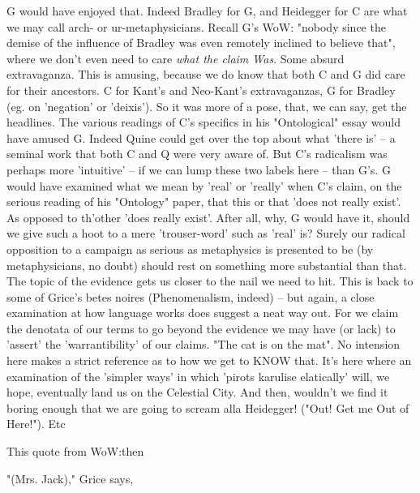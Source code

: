 \documentclass[10pt,titlepage]{book}
\begin{document}
{G would have enjoyed that. Indeed Bradley for G, and  
Heidegger for C are what we may call arch- or ur-metaphysicians. Recall G's 
WoW:  "nobody since the demise of the influence of Bradley was even remotely 
inclined  to believe that", where we don't even need to care {\it what the claim 
Was}. Some  absurd extravaganza. This is amusing, because we do know that 
both C and G did  care for their ancestors. C for Kant's and Neo-Kant's 
extravaganzas, G for  Bradley (eg. on 'negation' or 'deixis'). So it was more of a 
pose, that, we can  say, get the headlines. The various readings of C's 
specifics in his  "Ontological" essay would have amused G. Indeed Quine could 
get over the top  about what 'there is' -- a seminal work that both C and Q 
were very aware of.  But C's radicalism was perhaps more 'intuitive' -- if we 
can lump these two  labels here -- than G's. G would have examined what we 
mean by 'real' or  'really' when C's claim, on the serious reading of his 
"Ontology" paper, that  this or that 'does not really exist'. As opposed to 
th'other 'does really  exist'. After all, why, G would have it, should we give 
such a hoot to a mere  'trouser-word' such as 'real' is? Surely our radical 
opposition to a campaign as  serious as metaphysics is presented to be (by 
metaphysicians, no doubt) should  rest on something more substantial than 
that. The topic of the evidence gets us  closer to the nail we need to hit. 
This is back to some of Grice's betes noires  (Phenomenalism, indeed) -- but 
again, a close examination at how language works  does suggest a neat way out. 
For we claim the denotata of our terms to go beyond  the evidence we may 
have (or lack) to 'assert' the 'warrantibility' of our  claims. "The cat is on 
the mat". No intension here makes a strict reference as  to how we get to 
KNOW that. It's here where an examination of the 'simpler ways'  in which 
'pirots karulise elatically' will, we hope, eventually land us on the  
Celestial City. And then, wouldn't we find it boring enough that we are going to  
scream alla Heidegger! ("Out! Get me Out of Here!"). Etc

This quote from WoW:then
 
 
"(Mrs. Jack)," Grice says,

}
\end{document}
